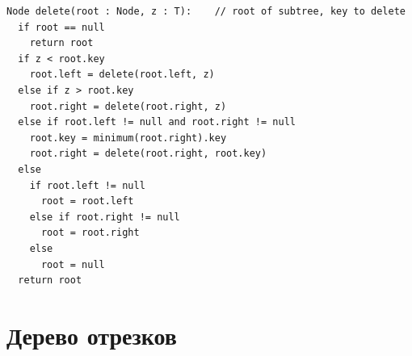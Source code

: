 \documentclass[a4paper]{article}
\begin{document}
\begin{lstlisting}
Node delete(root : Node, z : T):    // root of subtree, key to delete
  if root == null
    return root
  if z < root.key
    root.left = delete(root.left, z)
  else if z > root.key
    root.right = delete(root.right, z)
  else if root.left != null and root.right != null
    root.key = minimum(root.right).key
    root.right = delete(root.right, root.key)
  else
    if root.left != null
      root = root.left
    else if root.right != null
      root = root.right
    else
      root = null
  return root
\end{lstlisting}

\section{Дерево отрезков}
\end{document}
